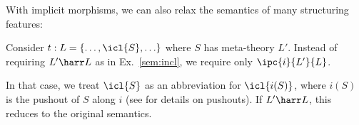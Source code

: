 With implicit morphisms, we can also relax the semantics of many structuring features:

\begin{example}\label{impl:incl2}
Consider $t:L=\{\ldots,\icl{S},\ldots\}$ where $S$ has meta-theory $L'$.
Instead of requiring $L'\harr L$ as in Ex.~\ref{sem:incl}, we require only $\ipc{i}{L'}{L}$.

In that case, we treat $\icl{S}$ as an abbreviation for $\icl{i(S)}$, where $i(S)$ is the pushout of $S$ along $i$ (see \cite{rabe:howto:14} for details on \mmt pushouts).
If $L'\harr L$, this reduces to the original semantics.
\end{example}

%
%
%
%

